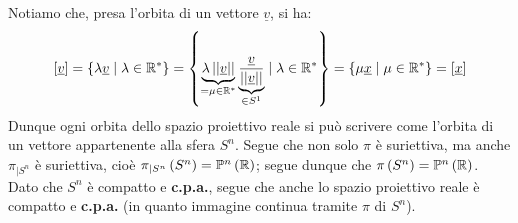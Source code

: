 \begin{demonstration}
\begin{enumerate}[label=\Roman*]
Notiamo che, presa l'orbita di un vettore $\underline{v}$, si ha:
\begin{equation*}
\left[\underline{v}\right]=\left\{\lambda \underline{v}\mid \lambda\in \mathbb{R}^{\ast}\right\}=\left\{\underbrace{\lambda \left|\left|\underline{v}\right|\right|}_{=\mu\in \mathbb{R}^{\ast}}\underbrace{\frac{\underline{v}}{\left|\left|\underline{v}\right|\right|}}_{\in S^1}\mid \lambda\in \mathbb{R}^{\ast}\right\}=\left\{\mu \underline{x}\mid \mu\in \mathbb{R}^{\ast}\right\}=\left[\underline{x}\right]
\end{equation*}
Dunque ogni orbita dello spazio proiettivo reale si può scrivere come l'orbita di un vettore appartenente alla sfera $S^n$. Segue che non solo $\pi$ è suriettiva, ma anche $\pi_{\mid S^n}$ è suriettiva, cioè $\pi_{\mid S^n}\left(S^n\right)=\proj[n]{\realset}$; segue dunque che $\pi\left(S^n\right)=\proj[n]{\realset}$. Dato che $S^n$ è compatto e \textbf{c.p.a.}, segue che anche lo spazio proiettivo reale è compatto e \textbf{c.p.a.} (in quanto immagine continua tramite $\pi$ di $S^n$).
\end{enumerate}
\end{demonstration}